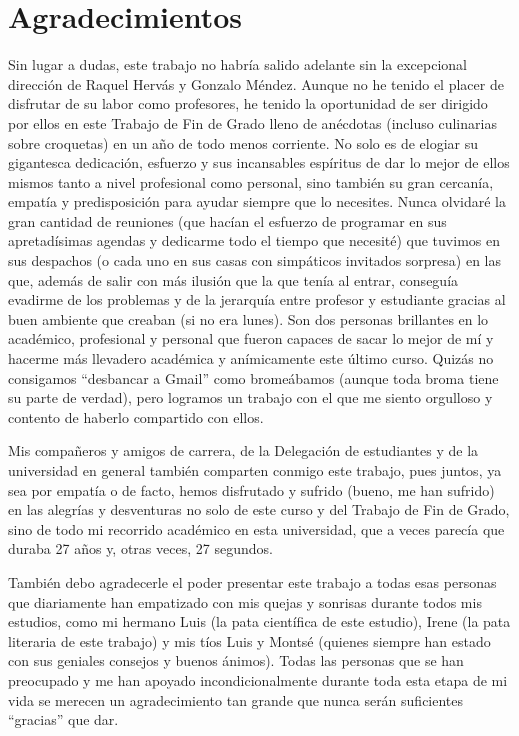 
\chapter*{Agradecimientos}

Sin lugar a dudas, este trabajo no habría salido adelante sin la excepcional dirección de Raquel Hervás y Gonzalo Méndez. Aunque no he tenido el placer de disfrutar de su labor como profesores, he tenido la oportunidad de ser dirigido por ellos en este Trabajo de Fin de Grado lleno de anécdotas (incluso culinarias sobre croquetas) en un año de todo menos corriente. No solo es de elogiar su gigantesca dedicación, esfuerzo y sus incansables espíritus de dar lo mejor de ellos mismos tanto a nivel profesional como personal, sino también su gran cercanía, empatía y predisposición para ayudar siempre que lo necesites. Nunca olvidaré la gran cantidad de reuniones (que hacían el esfuerzo de programar en sus apretadísimas agendas y dedicarme todo el tiempo que necesité) que tuvimos en sus despachos (o cada uno en sus casas con simpáticos invitados sorpresa) en las que, además de salir con más ilusión que la que tenía al entrar, conseguía evadirme de los problemas y de la jerarquía entre profesor y estudiante gracias al buen ambiente que creaban (si no era lunes). Son dos personas brillantes en lo académico, profesional y personal que fueron capaces de sacar lo mejor de mí y hacerme más llevadero académica y anímicamente este último curso. Quizás no consigamos ``desbancar a Gmail'' como bromeábamos (aunque toda broma tiene su parte de verdad), pero logramos un trabajo con el que me siento orgulloso y contento de haberlo compartido con ellos.

Mis compañeros y amigos de carrera, de la Delegación de estudiantes y de la universidad en general también comparten conmigo este trabajo, pues juntos, ya sea por empatía o de facto, hemos disfrutado y sufrido (bueno, me han sufrido) en las alegrías y desventuras no solo de este curso y del Trabajo de Fin de Grado, sino de todo mi recorrido académico en esta universidad, que a veces parecía que duraba 27 años y, otras veces, 27 segundos.

También debo agradecerle el poder presentar este trabajo a todas esas personas que diariamente han empatizado con mis quejas y sonrisas durante todos mis estudios, como mi hermano Luis (la pata científica de este estudio), Irene (la pata literaria de este trabajo) y mis tíos Luis y Montsé (quienes siempre han estado con sus geniales consejos y buenos ánimos). Todas las personas que se han preocupado y me han apoyado incondicionalmente durante toda esta etapa de mi vida se merecen un agradecimiento tan grande que nunca serán suficientes ``gracias'' que dar.

